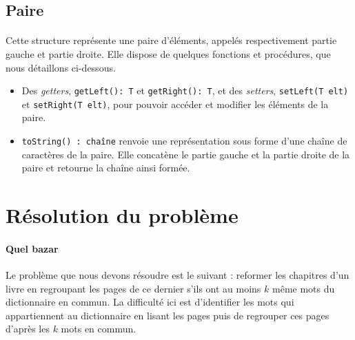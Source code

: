 \documentclass[a4paper]{article}
\begin{document}
		\subsection{Paire}
	    	\paragraph{}{
	    	Cette structure représente une paire d'éléments, appelés 
	    	respectivement partie gauche et partie droite. Elle dispose de quelques 
	    	fonctions et procédures, que nous détaillons ci-dessous.
	    	}
	    	
	    	\begin{itemize}
	    	
	    		\item Des \textit{getters}, \verb|getLeft(): T| et \verb|getRight(): T|, 
	    		et des \textit{setters}, \verb|setLeft(T elt)| et \verb|setRight(T elt)|, 
	    		pour pouvoir accéder et modifier les éléments de la paire.
	    		
	    		\item \verb|toString() : chaîne| renvoie une représentation sous forme 
	    		d'une chaîne de caractères de la paire. Elle concatène le partie gauche 
	    		et la partie droite de la paire et retourne la chaîne ainsi formée.
	    		
	    	\end{itemize}
		
	
	\newpage
		
	\section{Résolution du problème}
	
		\paragraph{Quel bazar}{
		Le problème que nous devons résoudre est le suivant : reformer les chapitres 
		d'un livre en regroupant les pages de ce dernier s'ils ont au moins $k$ même
		mots du dictionnaire en commun. La difficulté ici est d'identifier les mots 
		qui appartiennent au dictionnaire en lisant les pages puis de regrouper ces
		pages d'après les $k$ mots en commun.
		}
		
\end{document}
